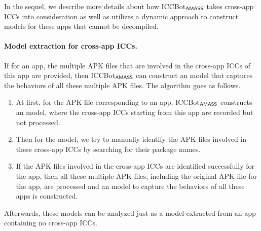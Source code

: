 
In the sequel, we describe more details about how ICCBot$_{\textsf{AMASS}}$ takes cross-app ICCs into consideration as well as utilizes a dynamic approach to construct {\AMASS} models for these apps that cannot be decompiled.

\paragraph{Model extraction for cross-app ICCs.} 
If for an app, the multiple APK files that are involved in the cross-app ICCs of this app are provided, then ICCBot$_{\textsf{AMASS}}$ can construct an {\AMASS} model that captures the behaviors of all these multiple APK files. The algorithm goes as follows. 
\begin{enumerate}
\item At first, for the APK file corresponding to an app, ICCBot$_{\textsf{AMASS}}$ constructs an {\AMASS} model, where the cross-app ICCs starting from this app are recorded but not processed. 
%
\item Then for the model, we try to manually identify the APK files involved in these cross-app ICCs by searching for their package names. 
%
\item If the APK files involved in the cross-app ICCs are identified successfully for the app, then all these multiple APK files, including the original APK file for the app, are processed and an {\AMASS} model to capture the behaviors of all these apps is constructed. 
\end{enumerate}
Afterwards, these models can be analyzed just as a model extracted from an app containing no cross-app ICCs. 

